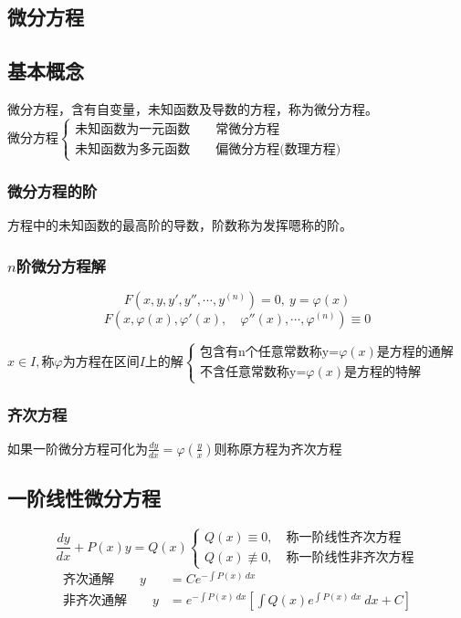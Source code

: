 \begin{center}\section{微分方程}\label{differential_equations}\end{center}
\subsection{基本概念}
\begin{center}
	微分方程，含有自变量，未知函数及导数的方程，称为微分方程。\\
	微分方程$\begin{cases}
		\mbox{未知函数为一元函数}\qquad\mbox{常微分方程}\\
		\mbox{未知函数为多元函数}\qquad\mbox{偏微分方程(数理方程)}
	\end{cases}$
\end{center}
\subsubsection{微分方程的阶}
\centerline{方程中的未知函数的最高阶的导数，阶数称为发挥嗯称的阶。}
\subsubsection{$n$阶微分方程解}
$$F(x,y,y',y'',\cdots,y^{(n)})=0,\  y=\varphi(x)$$ $$F(x,\varphi(x),\varphi'(x),\quad\varphi''(x),\cdots,\varphi^{(n)})\equiv0$$
\begin{center}	
	$x\in I,$称$\varphi$为方程在区间$I$上的解$\begin{cases}
		\mbox{包含有n个任意常数称y=$\varphi(x)$是方程的通解}\\
		\mbox{不含任意常数称y=$\varphi(x)$是方程的特解}
	\end{cases}$
\end{center}
 \subsubsection{齐次方程}
\centerline{如果一阶微分方程可化为$\frac{dy}{dx}=\varphi\left(\frac{y}{x}\right)$则称原方程为齐次方程}
 \subsection{一阶线性微分方程}
 $$\frac{dy}{dx}+P(x)y=Q(x)\begin{cases}
 	Q(x)\equiv 0,\quad\mbox{称一阶线性齐次方程}\\
 	Q(x)\not\equiv 0,\quad\mbox{称一阶线性非齐次方程}
  \end{cases}$$
\begin{align}                                          
	\mbox{齐次通解}\qquad y&=Ce^{-\int P(x)\ dx} \label{First_order_linear_differential_equation_1}\\
	\mbox{非齐次通解}\qquad y&=e^{-\int P(x)\ dx}\left[\int Q(x)e^{\int P(x)\ dx}\ dx+C\right] \label{First_order_linear_differential_equation_2}
\end{align}
